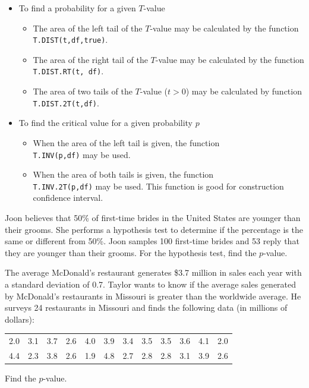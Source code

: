 \begin{itemize}
\item
  To find a probability for a given \(T\)-value

  \begin{itemize}
  \item
    The area of the left tail of the \(T\)-value may be calculated by
    the function \texttt{T.DIST(t,df,true)}.
  \item
    The area of the right tail of the \(T\)-value may be calculated by
    the function \texttt{T.DIST.RT(t,\ df)}.
  \item
    The area of two tails of the \(T\)-value
    (\(t > 0\)) may be calculated by
    function \texttt{T.DIST.2T(t,df)}.
  \end{itemize}
\item
  To find the critical value for a given probability \(p\)

  \begin{itemize}
  \item
    When the area of the left tail is given, the function\\
    \texttt{T.INV(p,df)} may be used.
  \item
    When the area of both tails is given, the function\\
    \texttt{T.INV.2T(p,df)} may be used. This function is good for
    construction confidence interval.
  \end{itemize}
\end{itemize}

\begin{exercise}

Joon believes that 50\% of first-time brides in the United States are
younger than their grooms. She performs a hypothesis test to determine
if the percentage is the same or different from 50\%. Joon samples 100
first-time brides and 53 reply that they are younger than their grooms.
For the hypothesis test, find the \(p\)-value.

\end{exercise}
\vspace*{6\baselineskip}

\begin{exercise}

The average McDonald's restaurant generates \$3.7 million in sales each
year with a standard deviation of 0.7. Taylor wants to know if the
average sales generated by McDonald's restaurants in Missouri is greater
than the worldwide average. He surveys 24 restaurants in Missouri and
finds the following data (in millions of dollars):

\begin{tabular}{*{12}{c}}
  2.0 & 3.1 & 3.7 & 2.6 & 4.0 & 3.9 & 3.4 & 3.5 & 3.5 & 3.6 & 4.1 & 2.0 \\ 
  4.4 & 2.3 & 3.8 & 2.6 & 1.9 & 4.8 & 2.7 & 2.8 & 2.8 & 3.1 & 3.9 & 2.6  
\end{tabular}

Find the \(p\)-value.

\end{exercise}
\vspace*{6\baselineskip}

